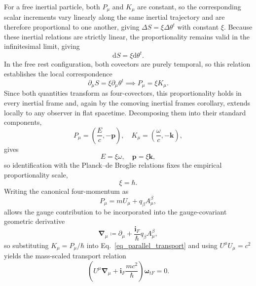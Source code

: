 For a free inertial particle, both $P_{\mu}$ and $K_{\mu}$ are constant, so the corresponding scalar increments vary linearly along the same inertial trajectory and are therefore proportional to one another, giving $\Delta S=\xi\Delta\theta^{t}$ with constant $\xi$. Because these inertial relations are strictly linear, the proportionality remains valid in the infinitesimal limit, giving
\begin{equation}\label{eq_action_temporalangle_relation}
    \mathrm{d}S = \xi\mathrm{d}\theta^{t}.
\end{equation}
In the free rest configuration, both covectors are purely temporal, so this relation establishes the local correspondence
\begin{equation}\label{eq_momentum_wavevector}
    \partial_{\mu}S = \xi\partial_{\mu}\theta^{t} \implies P_{\mu} = \xi K_{\mu}.
\end{equation}
Since both quantities transform as four-covectors, this proportionality holds in every inertial frame and, again by the comoving inertial frames corollary, extends locally to any observer in flat spacetime. Decomposing them into their standard components,
\begin{equation}
    P_{\mu} = \left(\frac{E}{c}, -\mathbf{p}\right),\quad K_{\mu} = \left(\frac{\omega}{c}, -\mathbf{k}\right),
\end{equation}
gives
\begin{equation}
    E = \xi\omega,\quad \mathbf{p} = \xi\mathbf{k},
\end{equation}
so identification with the Planck--de Broglie relations fixes the empirical proportionality scale,
\begin{equation}
    \xi = \hbar.
\end{equation}
Writing the canonical four-momentum as
\begin{equation}
    P_{\mu} = mU_{\mu} + q_{\beta}A_{\mu}^{\beta},
\end{equation}
allows the gauge contribution to be incorporated into the gauge-covariant geometric derivative
\begin{equation}
    \boldsymbol{\nabla}_{\mu} \coloneqq \partial_{\mu} + \frac{\mathbf{i}_{F}}{\hbar}q_{\beta}A_{\mu}^{\beta},
\end{equation}
so substituting $K_{\mu} = P_{\mu}/\hbar$ into Eq.~\eqref{eq_parallel_transport} and using $U^{\mu}U_{\mu} = c^{2}$ yields the mass-scaled transport relation
\begin{equation}\label{eq_transport_mass}
    \left(U^{\mu}\boldsymbol{\nabla}_{\mu} + \mathbf{i}_{F}\frac{mc^{2}}{\hbar}\right)\boldsymbol{\omega}_{tF} = 0.
\end{equation}

